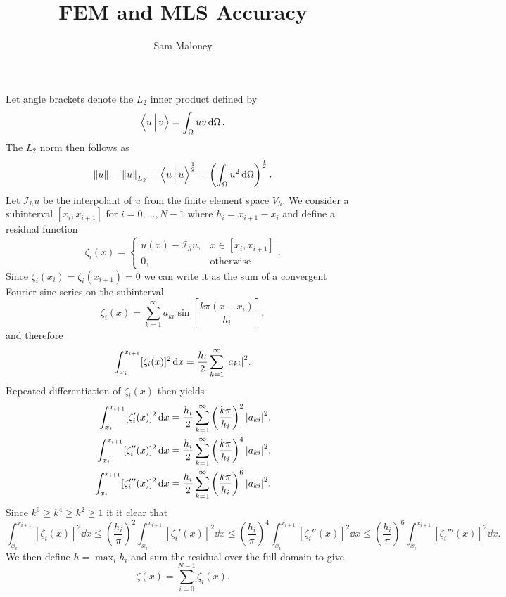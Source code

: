 \documentclass{article}
\newcommand*{\inner}[2]{\ip{\rule[0pt]{0pt}{10pt}#1\,}{\,#2}}
\newcommand*{\interp}[1]{\mathcal{I}_h #1}
\begin{document}
\title{
FEM and MLS Accuracy}
\author{Sam Maloney}

\maketitle


\noindent
Let angle brackets denote the $L_2$ inner product defined by
\begin{equation}
\inner{u}{v}=\int_\Omega uv\dd{\Omega}.
\end{equation}
The $L_2$ norm then follows as
\begin{equation}
\norm{u}=\norm{u}_{L_2}=\inner{u}{u}^\frac{1}{2}=\left(\int_\Omega u^2\dd{\Omega}\right)^\frac{1}{2}.
\end{equation}
Let $\interp{u}$ be the interpolant of $u$ from the finite element space $V_h$. We consider a subinterval $[x_i, x_{i+1}]$ for $i=0,...,N-1$ where $h_i=x_{i+1}-x_i$ and define a residual function
\begin{equation}
\zeta_i(x)=
\begin{cases}
u(x)-\interp{u}, & x\in[x_i, x_{i+1}]\\
0, & \mathrm{otherwise}
\end{cases}.
\end{equation}
Since $\zeta_i(x_i)=\zeta_i(x_{i+1})=0$ we can write it as the sum of a convergent Fourier sine series on the subinterval
\begin{equation}
\zeta_i(x)=\sum_{k=1}^\infty a_{ki}\sin\left[\frac{k\pi\left(x-x_i\right)}{h_i}\right],
\end{equation}
and therefore
\begin{equation}
\int_{x_i}^{x_{i+1}}[\zeta_i(x)]^2\dd{x}=\frac{h_i}{2}\sum_{k=1}^\infty\abs{a_{ki}}^2.
\end{equation}
Repeated differentiation of $\zeta_i(x)$ then yields
\begin{align}
\int_{x_i}^{x_{i+1}}[\zeta_i'(x)]^2\dd{x}&=\frac{h_i}{2}\sum_{k=1}^\infty\left(\frac{k\pi}{h_i}\right)^2\abs{a_{ki}}^2,\\
\int_{x_i}^{x_{i+1}}[\zeta_i''(x)]^2\dd{x}&=\frac{h_i}{2}\sum_{k=1}^\infty\left(\frac{k\pi}{h_i}\right)^4\abs{a_{ki}}^2,\\
\int_{x_i}^{x_{i+1}}[\zeta_i'''(x)]^2\dd{x}&=\frac{h_i}{2}\sum_{k=1}^\infty\left(\frac{k\pi}{h_i}\right)^6\abs{a_{ki}}^2.
\end{align}
Since $k^6\geq k^4\geq k^2\geq1$ it it clear that
\begin{equation}
\int_{x_i}^{x_{i+1}}[\zeta_i(x)]^2\dd{x}\leq\left(\frac{h_i}{\pi}\right)^2\int_{x_i}^{x_{i+1}}[\zeta_i'(x)]^2\dd{x}\leq\left(\frac{h_i}{\pi}\right)^4\int_{x_i}^{x_{i+1}}[\zeta_i''(x)]^2\dd{x}\leq\left(\frac{h_i}{\pi}\right)^6\int_{x_i}^{x_{i+1}}[\zeta_i'''(x)]^2\dd{x}.
\label{eqn:ordering}
\end{equation}
We then define $h=\max_i h_i$ and sum the residual over the full domain to give
\begin{equation}
\zeta(x)=\sum_{i=0}^{N-1}\zeta_i(x).
\end{equation}
\end{document}
